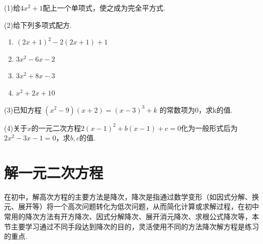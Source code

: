 \documentclass[lang=cn, 10pt, titlestyle=hang, oneside]{elegantbook}
\begin{document}
\begin{exercise}
\small
    \setlength{\parindent}{0pt} %
    \setlength{\columnseprule}{0.01pt}
    \begin{multicols}{2}
        \begin{minipage}{1\linewidth}
        (1)给\( 4x^2 +1\)配上一个单项式，使之成为完全平方式.
        \end{minipage}
        
        \begin{minipage}{1\linewidth}
        (2)给下列多项式配方.
        \begin{enumerate}
            \item \((2x+1)^2-2(2x+1)+1\)
            \item \(3x^2-6x-2\)
            \item \(3x^2+8x-3\)
            \item \(x^2+2x+10\)
        \end{enumerate}
        \end{minipage}
        \begin{minipage}{1\linewidth}
        (3)已知方程 $(x^2-9)(x+2) = (x-3)^3 + k$ 的常数项为0，求k的值.
        \end{minipage}

        \begin{minipage}{1\linewidth}
        (4)关于$x$的一元二次方程\(2(x-1)^2+b(x-1)+c=0\)化为一般形式后为\(2x^2-3x-1=0\)，求\(b,c\)的值.
        \end{minipage}
        
    \end{multicols}
\end{exercise}







\section{解一元二次方程}
在初中，解高次方程的主要方法是降次，降次是指通过数学变形（如因式分解、换元、展开等）将一个高次问题转化为低次问题，从而简化计算或求解过程，在初中常用的降次方法有开方降次、因式分解降次、展开消元降次、求根公式降次等，本节主要学习通过不同手段达到降次的目的，灵活使用不同的方法降次解方程是练习的重点.
\end{document}
